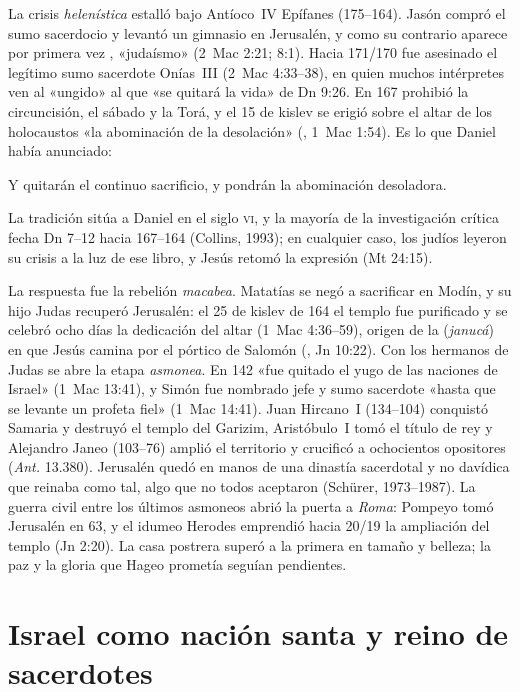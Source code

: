 La crisis \emph{helenística} estalló bajo Antíoco~IV Epífanes (175--164). Jasón compró el sumo sacerdocio y levantó un gimnasio en Jerusalén, y como su contrario aparece por primera vez , «judaísmo» (2~Mac 2:21; 8:1). Hacia 171/170 fue asesinado el legítimo sumo sacerdote Onías~III (2~Mac 4:33--38), en quien muchos intérpretes ven al «ungido» al que «se quitará la vida» de Dn 9:26. En 167 prohibió la circuncisión, el sábado y la Torá, y el 15 de kislev se erigió sobre el altar de los holocaustos «la abominación de la desolación» (, 1~Mac 1:54). Es lo que Daniel había anunciado:
\begin{cita}Y quitarán el continuo sacrificio, y pondrán la abominación desoladora.\end{cita} La tradición sitúa a Daniel en el siglo \textsc{vi}, y la mayoría de la investigación crítica fecha Dn 7--12 hacia 167--164 (Collins, 1993); en cualquier caso, los judíos leyeron su crisis a la luz de ese libro, y Jesús retomó la expresión (Mt 24:15).

La respuesta fue la rebelión \emph{macabea}. Matatías se negó a sacrificar en Modín, y su hijo Judas recuperó Jerusalén: el 25 de kislev de 164 el templo fue purificado y se celebró ocho días la dedicación del altar (1~Mac 4:36--59), origen de la  (\emph{janucá}) en que Jesús camina por el pórtico de Salomón (, Jn 10:22). Con los hermanos de Judas se abre la etapa \emph{asmonea}. En 142 «fue quitado el yugo de las naciones de Israel» (1~Mac 13:41), y Simón fue nombrado jefe y sumo sacerdote «hasta que se levante un profeta fiel» (1~Mac 14:41). Juan Hircano~I (134--104) conquistó Samaria y destruyó el templo del Garizim, Aristóbulo~I tomó el título de rey y Alejandro Janeo (103--76) amplió el territorio y crucificó a ochocientos opositores (\emph{Ant.} 13.380). Jerusalén quedó en manos de una dinastía sacerdotal y no davídica que reinaba como tal, algo que no todos aceptaron (Schürer, 1973--1987). La guerra civil entre los últimos asmoneos abrió la puerta a \emph{Roma}: Pompeyo tomó Jerusalén en 63, y el idumeo Herodes emprendió hacia 20/19 la ampliación del templo (Jn 2:20). La casa postrera superó a la primera en tamaño y belleza; la paz y la gloria que Hageo prometía seguían pendientes.

\section{Israel como nación santa y reino de sacerdotes}

